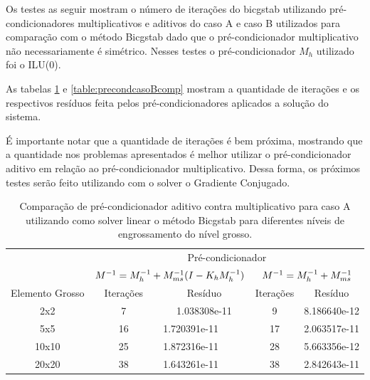 Os testes as seguir mostram o número de iterações do bicgstab utilizando pré-condicionadores multiplicativos e aditivos do caso A e caso B utilizados para comparação
com o método Bicgstab dado que o pré-condicionador multiplicativo não necessariamente é simétrico. Nesses testes o pré-condicionador $M_h$ utilizado foi o ILU(0).

As tabelas \ref{table:precondcasoAcomp} e \ref{table:precondcasoBcomp} mostram a quantidade de iterações e os respectivos resíduos feita pelos pré-condicionadores aplicados a solução do sistema. 

É importante notar que a quantidade de iterações é bem próxima, mostrando que a quantidade
nos problemas apresentados é melhor utilizar o pré-condicionador aditivo em relação ao pré-condicionador multiplicativo. Dessa forma, os próximos
testes serão feito utilizando com o solver o Gradiente Conjugado.

\begin{table}[]\label{table:precondcasoAcomp}
    \caption{Comparação de pré-condicionador aditivo contra multiplicativo para caso A utilizando como solver linear o método Bicgstab para diferentes níveis de engrossamento do nível grosso.}
    \begin{tabular}{c|c|l|c|l|}

    \cline{2-5}
                                          & \multicolumn{4}{c|}{Pré-condicionador}                                                        \\ \cline{2-5} 
                                          & \multicolumn{2}{c|}{$M^{-1}=M^{-1}_{h} + M^{-1}_{ms}(I-K_hM^{-1}_{h})$}               & \multicolumn{2}{c|}{$M^{-1}=M^{-1}_{h} + M^{-1}_{ms}$}                \\ \hline
    \multicolumn{1}{|c|}{Elemento Grosso} & Iterações & \multicolumn{1}{c|}{Resíduo}      & Iterações & \multicolumn{1}{c|}{Resíduo}      \\ \hline
    \multicolumn{1}{|c|}{2x2}             & 7         & \multicolumn{1}{c|}{1.038308e-11} & 9         & \multicolumn{1}{c|}{8.186640e-12} \\ \hline
    \multicolumn{1}{|c|}{5x5}             & 16        & 1.720391e-11                      & 17        & 2.063517e-11                      \\ \hline
    \multicolumn{1}{|c|}{10x10}           & 25        & 1.872316e-11                      & 28        & 5.663356e-12                      \\ \hline
    \multicolumn{1}{|c|}{20x20}           & 38        & 1.643261e-11                      & 38        & 2.842643e-11                      \\ \hline
    \end{tabular}
\end{table}


